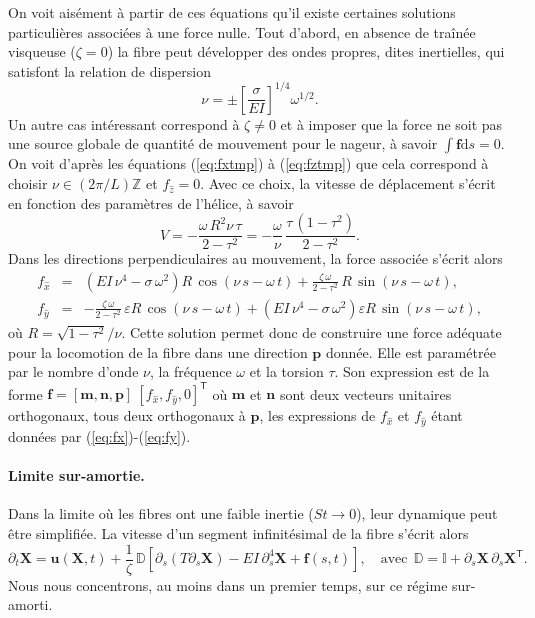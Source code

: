 \documentclass[a4paper,11pt]{article}
\begin{document}
On voit aisément à partir de ces équations qu'il existe certaines solutions particulières associées à une force nulle.  Tout d'abord, en absence de traînée visqueuse ($\zeta=0$)  la fibre peut développer des ondes propres, dites inertielles, qui satisfont la relation de dispersion
\begin{equation}
  \nu = \pm\left[\frac{\sigma}{EI}\right]^{1/4}\omega^{1/2}.
\end{equation}
Un autre cas intéressant correspond à $\zeta\neq0$ et à imposer que la force ne soit pas une source globale de quantité de mouvement pour le nageur, à savoir $\int \bm f \mathrm{d}s = 0$. On voit d'après les équations (\ref{eq:fxtmp}) à (\ref{eq:fztmp}) que cela correspond à choisir $\nu \in (2\pi/L)\mathbb{Z}$ et $f_{\hat{z}} = 0$. Avec ce choix, la vitesse de déplacement s'écrit en fonction des paramètres de l'hélice, à savoir
\begin{equation}
  V = -\frac{\omega\,R^2\nu\,\tau}{2-\tau^2} = -\frac{\omega}{\nu} \, \frac{\tau\,(1-\tau^2)}{2-\tau^2}.
\end{equation}
Dans les directions perpendiculaires au mouvement, la force associée s'écrit alors
\begin{eqnarray}
  f_{\hat{x}} &=& \left(EI\,\nu^4-\sigma\,\omega^2\right) R\,\cos(\nu\,s-\omega\,t) + \frac{\zeta\,\omega}{2-\tau^2}\,R\,\sin(\nu\,s-\omega\,t), \label{eq:fx}\\
  f_{\hat{y}}&=& - \frac{\zeta\, \omega}{2-\tau^2}\,\varepsilon R\, \cos(\nu\,s-\omega\,t)+\left(EI\,\nu^4-\sigma\,\omega^2\right) \varepsilon R\,\sin(\nu\,s-\omega\,t), \label{eq:fy}
\end{eqnarray}
où $R = \sqrt{1-\tau^2}/\nu$. Cette solution permet donc de construire une force adéquate pour la locomotion de la fibre dans une direction $\bm p$ donnée. Elle est paramétrée par le nombre d'onde $\nu$, la fréquence $\omega$ et la torsion $\tau$. Son expression est de la forme $\bm f = [\bm m, \bm n, \bm p]\  [f_{\hat{x}}, f_{\hat{y}},0]^{\mathsf{T}}$ où  $\bm m$ et $\bm n$ sont deux vecteurs unitaires orthogonaux, tous deux orthogonaux à $\bm p$, les expressions de $f_{\hat{x}}$ et $f_{\hat{y}}$ étant données par (\ref{eq:fx})-(\ref{eq:fy}).

\paragraph{Limite sur-amortie.} Dans la limite où les fibres ont une faible inertie ($St\to0$), leur dynamique peut être simplifiée. La vitesse d'un segment infinitésimal de la fibre s'écrit alors
\begin{equation}
  \partial_t \bm X = \bm u(\bm X,t) +\frac{1}{\zeta}\,\mathbb{D}\left[ \partial_s(T\partial_s \bm X) - EI\,\partial_s^4 \bm X + \bm f(s,t) \right]\!,\quad\mbox{avec}\ \ \mathbb{D} = \mathbb{I} + \partial_s\bm X\,\partial_s\bm X^{\mathsf{T}}.
  \label{eq:vel_fib}
\end{equation}
Nous nous concentrons, au moins dans un premier temps, sur ce régime sur-amorti. 



\end{document}
